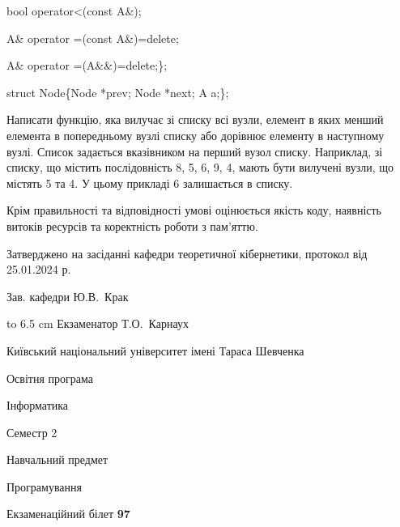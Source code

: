 \documentclass[12pt, ukrainian]{article}
\begin{document}
{\quad  bool operator<(const A\&); 

\quad A\& operator =(const A\&)=delete; 

\quad  A\& operator =(A\&\&)=delete;\};

struct Node\{Node *prev; Node *next; A a;\};

Написати функцію, яка вилучає зі списку всі вузли, елемент в яких менший елемента в попередньому вузлі списку або дорівнює елементу в наступному вузлі. Список задається вказівником на перший вузол списку. Наприклад, зі списку, що містить послідовність 8, 5, 6, 9, 4, мають бути вилучені вузли, що містять 5 та 4. У цьому прикладі 6 залишається в списку.

Крім правильності та відповідності умові оцінюється якість коду, наявність витоків ресурсів та коректність роботи з пам'яттю. 

}
{\smallskip\smallskip \begin {scriptsize} Затверджено на засіданні кафедри теоретичної кібернетики, протокол   від   25.01.2024 р.\par\smallskip\smallskip\smallskip\smallskip
{\parbox {6.5 cm} {Зав. кафедри \dotfill Ю.В.~Крак}}\hspace {0.7cm} {\hbox to 6.5 cm { Екзаменатор \dotfill Т.О.~Карнаух}} \end{scriptsize}}
\newpage
{{\begin {scriptsize}\par
{ \center  Київський національний університет імені Тараса Шевченка \par}
{\parbox {5 cm}{Освітня програма \hfill}{\parbox {7 cm}{Інформатика\hfill}}\parbox {6 cm}{\hfill Семестр 2}}\par
{\parbox {5 cm} {Навчальний предмет \hfill}\parbox {7 cm}{Програмування \hfill}\parbox {6cm}{\hfill}\par}\vspace{-15pt} \end{scriptsize}}{\center Екзаменаційний білет \No \textbf { 97 }\par}}
\end{document}
